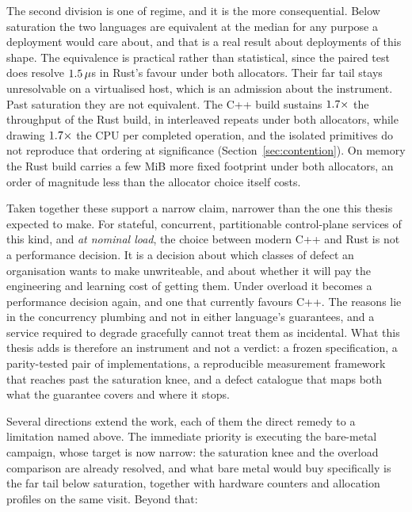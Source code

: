 \documentclass[english,oneside,a4paper,censored,csm,software-track-2020]{HYthesisML}
\begin{document}
The second division is one of regime, and it is the more consequential. Below saturation the two
languages are equivalent at the median for any purpose a deployment would care about, and that is a
real result about deployments of this shape. The equivalence is practical rather than statistical,
since the paired test does resolve $1.5\,\mu$s in Rust's favour under both
allocators. Their far tail stays unresolvable on a virtualised host, which is an admission about the
instrument. Past saturation they are not equivalent. The C++ build sustains
$1.7\times$ the throughput of the Rust build, in \OverloadThrAgree{} interleaved
repeats under both allocators, while drawing $1.7\times$ the CPU per completed
operation, and the isolated primitives do not reproduce that ordering at significance
(Section~\ref{sec:contention}). On memory the Rust build carries a few MiB more fixed footprint
under both allocators, an order of magnitude less than the allocator choice itself costs.

Taken together these support a narrow claim, narrower than the one this thesis expected
to make. For stateful, concurrent, partitionable control-plane services of this kind, and
\emph{at nominal load}, the choice between modern C++ and Rust is not a performance decision. It
is a decision about which classes of defect an organisation wants to make unwriteable, and about
whether it will pay the engineering and learning cost of getting them. Under overload it becomes
a performance decision again, and one that currently favours C++. The reasons lie in the
concurrency plumbing and not in either language's guarantees, and a service required to degrade
gracefully cannot treat them as incidental. What this thesis adds is therefore an instrument and
not a verdict: a frozen specification, a parity-tested pair of implementations, a reproducible
measurement framework that reaches past the saturation knee, and a defect catalogue that maps
both what the guarantee covers and where it stops.

Several directions extend the work, each of them the direct remedy to a limitation named above.
The immediate priority is executing the bare-metal campaign, whose target is now narrow: the
saturation knee and the overload comparison are already resolved, and what bare metal would buy
specifically is the far tail below saturation, together with hardware counters and allocation
profiles on the same visit. Beyond that:
\end{document}
